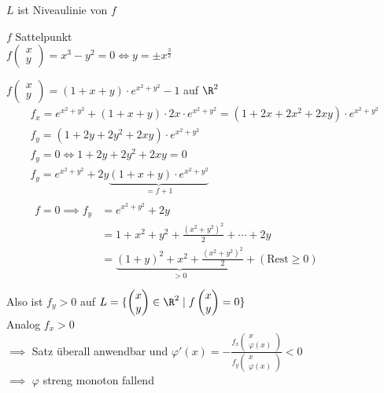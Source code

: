 \begin{bem}
	$L$ ist Niveaulinie von $f$
\end{bem}
\begin{bem}[note = Singuläre Punkte von $L$]
	$f$ Sattelpunkt \\
	$f\begin{pmatrix} x \\ y \end{pmatrix} = x^3 - y^2 = 0 \iff y = \pm x^{\frac{3}{2}}$
\end{bem}
\begin{bsp}
	$f\begin{pmatrix} x \\ y \end{pmatrix} = ( 1 + x + y ) \cdot e^{x^2 + y^2} - 1$ auf $\R^2$
	\begin{gather*}
		f_x = e^{x^2+y^2} + ( 1 + x + y ) \cdot 2x \cdot e^{x^2+y^2} = ( 1 + 2x + 2x^2 + 2xy ) \cdot e^{x^2+y^2} \\
		f_y = ( 1 + 2y + 2y^2 + 2xy ) \cdot e^{x^2+y^2} \\
		f_y = 0 \iff 1 + 2y + 2y^2 + 2xy = 0 \\
		f_y = e^{x^2+y^2} + 2y\underbrace{( 1 + x + y ) \cdot e^{x^2+y^2}}_{=f+1} \\
		\begin{split}
			f = 0 \implies f_y
				&= e^{x^2+y^2} + 2y \\
				&= 1 + x^2 + y^2 + \frac{(x^2+y^2)^2}{2} + \dotsb + 2y \\
				&= \underbrace{(1+y)^2 + x^2 + \frac{(x^2+y^2)^2}{2}}_{>0} + (\text{Rest} \geq 0) \\
		\end{split}
	\end{gather*}
	Also ist $f_y > 0$ auf $L = \{ \begin{pmatrix} x \\ y \end{pmatrix} \in \R^2 \mid f\begin{pmatrix} x \\ y \end{pmatrix} = 0 \}$ \\
	Analog $f_x > 0$ \\
	$\implies$ Satz überall anwendbar und $\varphi'(x) = -\frac{f_x\begin{pmatrix} x \\ \varphi(x) \end{pmatrix}}{f_y\begin{pmatrix} x \\ \varphi(x) \end{pmatrix}} < 0$ \\
	$\implies$ $\varphi$ streng monoton fallend
\end{bsp}
